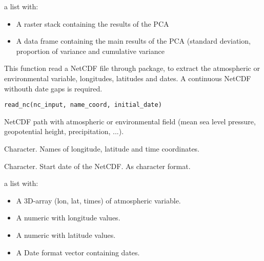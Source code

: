 \documentclass[a4paper]{book}
\begin{document}
%
\begin{Value}
a list with: \begin{itemize}

\item A raster stack containing the results of the PCA 
\item A data frame containing the main results of the PCA (standard deviation, proportion of variance and cumulative variance

\end{itemize}

\end{Value}
%
\begin{Description}\relax
This function read a NetCDF file through  package, to extract the atmospheric or environmental variable, longitudes, latitudes and dates. A continuous NetCDF withouth date gaps is required.
\end{Description}
%
\begin{Usage}
\begin{verbatim}
read_nc(nc_input, name_coord, initial_date)
\end{verbatim}
\end{Usage}
%
\begin{Arguments}
\begin{ldescription}
\item[\code{nc\_input}] NetCDF path with atmospheric or environmental field (mean sea level pressure, geopotential height, precipitation, ...).

\item[\code{name\_coord}] Character. Names of longitude, latitude and time coordinates.

\item[\code{initial\_date}] Character. Start date of the NetCDF. As character format.
\end{ldescription}
\end{Arguments}
%
\begin{Value}
a list with: \begin{itemize}

\item A 3D-array (lon, lat, times) of atmospheric variable.
\item A numeric with longitude values.
\item A numeric with latitude values.
\item A Date format vector containing dates.

\end{itemize}

\end{Value}
\end{document}
